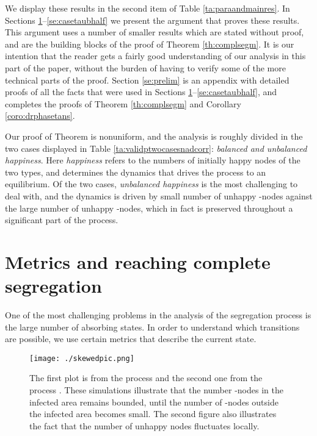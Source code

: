 \documentclass[11pt]{article}
\theoremstyle{plain}
\numberwithin{equation}{subsection}
\begin{document}
We display these results in the second item of Table \ref{ta:paraandmainres}.
In Sections \ref{se:analyticsche}--\ref{se:casetaubhalf} we present the argument that proves these results.
This argument uses a number of smaller results which are stated without proof, and are the building blocks of
the proof of Theorem \ref{th:complsegm}. It is our intention that the reader gets a fairly good understanding
of our analysis in this part of the paper, without the burden of having to verify some of the more technical
parts of the proof. Section \ref{se:prelim} is an appendix with detailed proofs of all the facts that were used in
Sections \ref{se:analyticsche}--\ref{se:casetaubhalf}, and completes the proofs of Theorem \ref{th:complsegm} and
Corollary \ref{coro:drphasetans}.

Our proof of Theorem 
is nonuniform, and the analysis is roughly divided in the two cases displayed in Table \ref{ta:validptwocasesnadcorr}:
{\em balanced and unbalanced happiness}. Here {\em happiness} refers to the numbers of initially happy nodes of the
two types, and determines the dynamics that drives the process to an equilibrium. Of the two cases, 
{\em unbalanced happiness} is the most challenging to deal with, and the dynamics is driven by small number of unhappy
-nodes against the large number of unhappy -nodes, which in fact is preserved throughout a significant part of the process.
 

\section{Metrics and reaching complete segregation}\label{se:analyticsche}
One of the most challenging problems in the analysis of the segregation process
is the large number of absorbing states. In order to understand which transitions are possible,
we use certain metrics that 
describe the current state.


\begin{figure}
\texttt{[image: ./skewedpic.png]}
\centering
 \caption{The first plot is
from the process 
and the second one 
from the process .
These simulations illustrate that the number -nodes in the infected area remains bounded, until
the number of -nodes outside the infected area becomes small. The second figure also illustrates
the fact that the number of unhappy nodes fluctuates locally.}\label{fig:inf_area}
\end{figure}  
\end{document}
